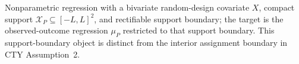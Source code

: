 Nonparametric regression with a bivariate random-design covariate \(X\), compact support \(\mathcal X_P\subseteq[-L,L]^2\), and rectifiable support boundary; the target is the observed-outcome regression \(\mu_P\) restricted to that support boundary.  This support-boundary object is distinct from the interior assignment boundary in CTY Assumption~2.